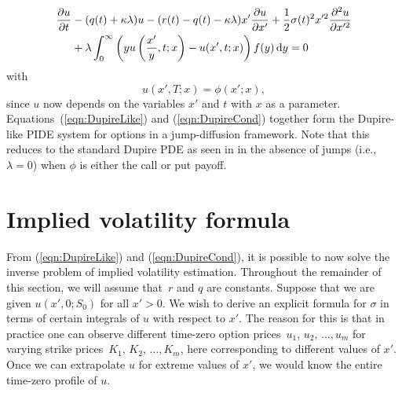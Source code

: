 	\begin{align}
		\label{eqn:DupireLike}
		\begin{split}
		\frac{\partial u}{\partial t} &- (q(t) + \kappa\lambda)u - (r(t) - q(t) - \kappa\lambda)x'\frac{\partial u}{\partial x'} + \frac{1}{2}\sigma(t)^2x'^2\frac{\partial^2 u}{\partial x'^2} \\
		& {} + \lambda \int_0^\infty \left( yu\left( \frac{x'}{y},t; x \right) - u(x',t; x) \right)f(y) \, \mathrm d y = 0
		\end{split}
	\end{align}
with
	\begin{equation}
		\label{eqn:DupireCond}
		u(x',T; x) = \phi(x';x),
	\end{equation}
since $u$ now depends on the variables $x'$ and $t$ with $x$ as a parameter. Equations~(\ref{eqn:DupireLike}) and (\ref{eqn:DupireCond}) together form the Dupire-like PIDE system for options in a jump-diffusion framework. Note that this reduces to the standard Dupire PDE as seen in \cite{Gatheral2006} in the absence of jumps (i.e., $\lambda = 0$) when $\phi$ is either the call or put payoff.

\section{Implied volatility formula}
From (\ref{eqn:DupireLike}) and (\ref{eqn:DupireCond}), it is possible to now solve the inverse problem of implied volatility estimation. Throughout the remainder of this section, we will assume that~$r$ and $q$ are constants. Suppose that we are given $u(x',0;S_0)$ for all $x' > 0$. We wish to derive an explicit formula for $\sigma$ in terms of certain integrals of $u$ with respect to $x'$. The reason for this is that in practice one can observe different time-zero option prices~$u_1,\, u_2, \, \ldots, u_m$ for varying strike prices~$K_1, \, K_2, \, \ldots, K_m$, here corresponding to different values of $x'$. Once we can extrapolate $u$ for extreme values of $x'$, we would know the entire time-zero profile of $u$.


